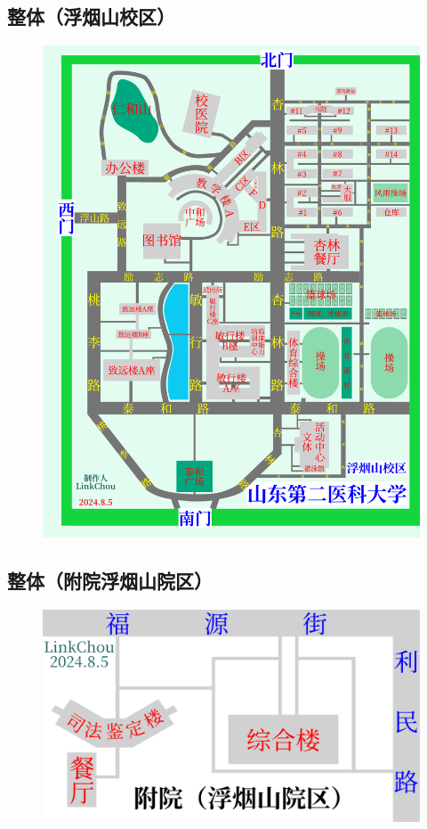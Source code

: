 \subsection[整体（浮烟山校区）]{整体（浮烟山校区）}
\begin{figure}[H]
    \centering
    \includegraphics*[width=\textwidth]{resources/map/浮烟山校区简图.pdf}
    \label{map_fuyanshan_holistic}
\end{figure}

\newpage
\subsection[整体（附院浮烟山院区）]{整体（附院浮烟山院区）}
\begin{figure}[H]
    \centering
    \includegraphics*[width=\textwidth]{resources/map/附院_浮烟山院区.pdf} %
    \label{map_affiliated_hospital_fuyanshan}
\end{figure}

